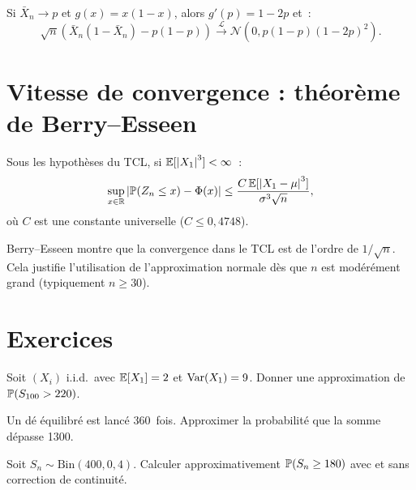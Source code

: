 \begin{exemple}
Si $\bar{X}_n \to p$ et $g(x) = x(1-x)$, alors
$g'(p) = 1-2p$ et~:
\[
    \sqrt{n}(\bar{X}_n(1-\bar{X}_n) - p(1-p))
    \xrightarrow{\mathcal{L}} \mathcal{N}(0, p(1-p)(1-2p)^2).
\]
\end{exemple}

\section{Vitesse de convergence : th\'eor\`eme de Berry--Esseen}

\begin{theoreme}
Sous les hypoth\`eses du TCL, si $\mathbb{E}[\left| X_1 \right|^3] < \infty$~:
\[
    \sup_{x \in \mathbb{R}} \left| \mathbb{P}(Z_n \leq x) - \Phi(x) \right|
    \leq \frac{C\, \mathbb{E}[\left| X_1 - \mu \right|^3]}{\sigma^3 \sqrt{n}},
\]
o\`u $C$ est une constante universelle ($C \leq 0{,}4748$).
\end{theoreme}

\begin{remarque}
Berry--Esseen montre que la convergence dans le TCL est de l'ordre de $1/\sqrt{n}$.
Cela justifie l'utilisation de l'approximation normale d\`es que $n$ est
mod\'er\'ement grand (typiquement $n \geq 30$).
\end{remarque}

\section{Exercices}

\begin{exercice}
Soit $(X_i)$ i.i.d.\ avec $\mathbb{E}[X_1] = 2$ et $\mathrm{Var}(X_1) = 9$. Donner une
approximation de $\mathbb{P}(S_{100} > 220)$.
\end{exercice}

\begin{exercice}
Un d\'e \'equilibr\'e est lanc\'e 360~fois. Approximer la probabilit\'e que la
somme d\'epasse 1300.
\end{exercice}

\begin{exercice}
Soit $S_n \sim \text{Bin}(400, 0{,}4)$. Calculer approximativement
$\mathbb{P}(S_n \geq 180)$ avec et sans correction de continuit\'e.
\end{exercice}

